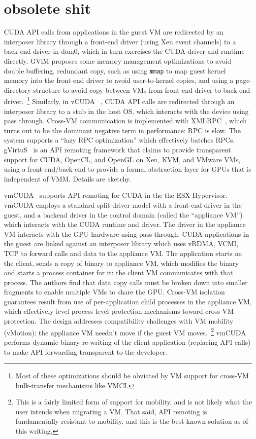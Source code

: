 \section{obsolete shit}
CUDA API calls from applications in the guest VM are redirected by an interposer library through
a front-end driver (using Xen event channels) to a back-end driver in dom0, which in turn exercises the CUDA driver and runtime
directly. GViM proposes some memory management optimizations to avoid double buffering, redundant copy, such as using
{\tt mmap} to map guest kernel memory into the front end driver to avoid user-to-kernel copies, and using a page-directory
structure to avoid copy between VMs from front-end driver to back-end driver.~\footnote{Most of these optimizations should be obviated by
VM support for cross-VM bulk-transfer mechanisms like VMCI.}
Similarly, in vCUDA ~\cite{vCUDA}, CUDA API calls are redirected
through an interposer library to a stub in the host OS, which interacts with the device using pass through.
Cross-VM communication is implemented with XMLRPC~\cite{XMLRPC}, which turns out to be the dominant negative term in performance:
RPC is slow. The system supports a ``lazy RPC optimization''  which effectively batches RPCs.
gVirtuS~\cite{gVirtuS} is an API remoting framework that claims to provide
transparent support for CUDA, OpenCL, and OpenGL on Xen, KVM, and VMware VMs, using a front-end/back-end
to provide a formal abstraction layer for GPUs that is independent of VMM. Details are sketchy.

vmCUDA~\cite{vmCUDA} supports API remoting for CUDA in the the ESX Hypervisor.
vmCUDA employs a
standard split-driver model with a front-end driver in the guest, and a backend driver in the control domain (called
the ``appliance VM'') which interacts with the CUDA runtime and driver.
The driver in the appliance VM interacts with the GPU hardware using pass-through.
CUDA applications in the guest are linked against an interposer
library which uses vRDMA, VCMI, TCP to forward calls and data to the appliance VM. The application starts on the client,
sends a copy of binary to appliance VM, which modifies the binary and starts a process container for it: the client VM
communicates with that process. The authors find that data copy calls must be broken down into smaller fragments to enable
multiple VMs to share the GPU. Cross-VM isolation guarantees result from use of per-application child processes
in the appliance VM, which effectively level process-level protection mechanisms toward cross-VM protection.
The design addresses compatibility challenges with VM mobility (vMotion): the appliance VM needn't move if the
guest VM moves.~\footnote{This is a fairly limited form of support for mobility, and is not likely what the
user intends when migrating a VM. That said, API remoting is fundamentally resistant to mobility, and this
is the best known solution as of this writing.} vmCUDA performs dynamic binary re-writing of the client application
(replacing API calls) to make API forwarding transparent to the developer.

